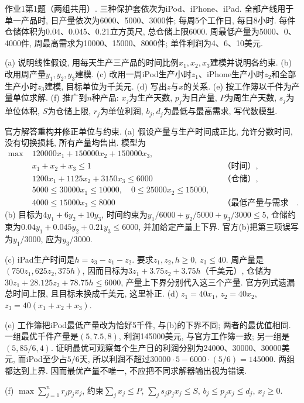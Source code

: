 \begin{exercise}\label{ass:15053-ps1-q1}
作业1第1题（两组共用）. 三种保护套依次为iPod、iPhone、iPad. 全部产线用于单一产品时, 日产量依次为6000、5000、3000件; 每周5个工作日, 每日8小时. 每件仓储体积为0.04、0.045、0.21立方英尺, 总仓储上限6000. 周最低产量为5000、0、4000件, 周最高需求为10000、15000、8000件; 单件利润为4、6、10美元.

(a) 说明线性假设, 用每天生产三产品的时间比例$x_1,x_2,x_3$建模并说明各约束. (b) 改用周产量$y_1,y_2,y_3$建模. (c) 改用一周iPod生产小时$z_1$、iPhone生产小时$z_2$和全部生产小时$z_3$建模, 目标单位为千美元. (d) 写出$z$与$x$的关系. (e) 按工作簿以千件为产量单位求解. (f) 推广到$n$种产品: $x_j$为生产天数, $p_j$为日产量, $P$为周生产天数, $s_j$为单位体积, $S$为仓储上限, $r_j$为单位利润, $b_j,d_j$为最低与最高需求, 写代数模型.
\end{exercise}
\begin{solution}
官方解答重构并修正单位与约束. (a) 假设产量与生产时间成正比, 允许分数时间, 没有切换损耗, 所有产量均售出. 模型为
\begin{align*}
\max\;&120000x_1+150000x_2+150000x_3,\\
&x_1+x_2+x_3\le1 &&\text{（时间）},\\
&1200x_1+1125x_2+3150x_3\le6000&&\text{（仓储）},\\
&5000\le30000x_1\le10000,\quad0\le25000x_2\le15000,\\
&4000\le15000x_3\le8000&&\text{（最低产量与需求上限）}.
\end{align*}
(b) 目标为$4y_1+6y_2+10y_3$, 时间约束为$y_1/6000+y_2/5000+y_3/3000\le5$, 仓储约束为$0.04y_1+0.045y_2+0.21y_3\le6000$, 并加给定产量上下界. 官方(b)把第三项误写为$y_1/3000$, 应为$y_3/3000$.

(c) iPad生产时间是$h=z_3-z_1-z_2$. 要求$z_1,z_2,h\ge0$, $z_3\le40$. 周产量是$(750z_1,625z_2,375h)$, 因而目标为$3z_1+3.75z_2+3.75h$（千美元）, 仓储为$30z_1+28.125z_2+78.75h\le6000$, 产量上下界分别代入这三个产量. 官方列式遗漏总时间上限, 且目标未换成千美元, 这里补正. (d) $z_1=40x_1$, $z_2=40x_2$, $z_3=40(x_1+x_2+x_3)$.

(e) 工作簿把iPod最低产量改为恰好5千件, 与(b)的下界不同; 两者的最优值相同. 一组最优千件产量是$(5,7.5,8)$, 利润145000美元, 与官方工作簿一致; 另一组是$(5,85/6,4)$. 证明最优可观察每个生产日的利润分别为24000、30000、30000美元, 而iPod至少占$5/6$天, 所以利润不超过$30000\cdot5-6000\cdot(5/6)=145000$. 两组都达到上界. 因而最优产量不唯一, 不应把不同求解器输出视为错误.

(f) $\max\sum_{j=1}^nr_jp_jx_j$, 约束$\sum_jx_j\le P$, $\sum_js_jp_jx_j\le S$, $b_j\le p_jx_j\le d_j$, $x_j\ge0$.
\end{solution}

